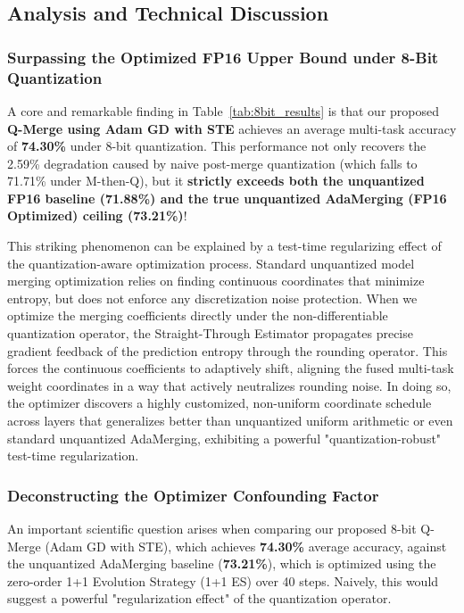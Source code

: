 \subsection{Analysis and Technical Discussion}

\subsubsection{Surpassing the Optimized FP16 Upper Bound under 8-Bit Quantization}
A core and remarkable finding in Table~\ref{tab:8bit_results} is that our proposed \textbf{Q-Merge using Adam GD with STE} achieves an average multi-task accuracy of \textbf{74.30\%} under 8-bit quantization. This performance not only recovers the 2.59\% degradation caused by naive post-merge quantization (which falls to 71.71\% under M-then-Q), but it \textbf{strictly exceeds both the unquantized FP16 baseline (71.88\%) and the true unquantized AdaMerging (FP16 Optimized) ceiling (73.21\%)}!

This striking phenomenon can be explained by a test-time regularizing effect of the quantization-aware optimization process. Standard unquantized model merging optimization relies on finding continuous coordinates that minimize entropy, but does not enforce any discretization noise protection. When we optimize the merging coefficients directly under the non-differentiable quantization operator, the Straight-Through Estimator propagates precise gradient feedback of the prediction entropy through the rounding operator. This forces the continuous coefficients to adaptively shift, aligning the fused multi-task weight coordinates in a way that actively neutralizes rounding noise. In doing so, the optimizer discovers a highly customized, non-uniform coordinate schedule across layers that generalizes better than unquantized uniform arithmetic or even standard unquantized AdaMerging, exhibiting a powerful "quantization-robust" test-time regularization.

\subsubsection{Deconstructing the Optimizer Confounding Factor}
An important scientific question arises when comparing our proposed 8-bit Q-Merge (Adam GD with STE), which achieves \textbf{74.30\%} average accuracy, against the unquantized AdaMerging baseline (\textbf{73.21\%}), which is optimized using the zero-order 1+1 Evolution Strategy (1+1 ES) over 40 steps. Naively, this would suggest a powerful "regularization effect" of the quantization operator.

